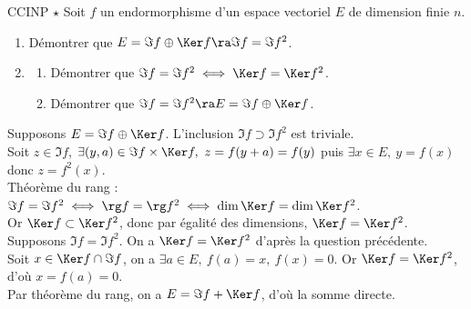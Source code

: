 \documentclass[11pt]{article}
\begin{document}

\begin{exercice}{CCINP $\star$}{}
    Soit $f$ un endormorphisme d'un espace vectoriel $E$ de dimension finie $n$.
    \begin{enumerate}
        \item Démontrer que $E=\Im f \oplus \Ker f \ra \Im f = \Im f^2$.
        \item \begin{enumerate}
            \item Démontrer que $\Im f = \Im f^2 \iff \Ker f = \Ker f^2$.
            \item Démontrer que $\Im f = \Im f^2 \ra E = \Im f \oplus \Ker f$.
        \end{enumerate}
    \end{enumerate}
    \tcblower
     Supposons $E=\Im f \oplus \Ker f$. L'inclusion $\Im f \supset \Im f^2$ est triviale.\\
    \boxed{\subset} Soit $z\in \Im f$, $\exists (y,a) \in \Im f\times \Ker f, ~ z=f(y+a)=f(y)$ puis $\exists x \in E, ~ y=f(x)$ donc $z=f^2(x)$.\\
     Théorème du rang : $\Im f = \Im f^2 \iff \rg f = \rg f^2 \iff \dim \Ker f = \dim \Ker f^2$.\\
    Or $\Ker f \subset \Ker f^2$, donc par égalité des dimensions, $\Ker f = \Ker f^2$.\\
     Supposons $\Im f = \Im f^2$. On a $\Ker f = \Ker f^2$ d'après la question précédente.\\
    Soit $x\in \Ker f \cap \Im f$, on a $\exists a \in E, ~ f(a)=x, ~ f(x)=0$. Or $\Ker f = \Ker f^2$, d'où $x=f(a)=0$.\\
    Par théorème du rang, on a $E=\Im f + \Ker f$, d'où la somme directe.
\end{exercice}

\pagebreak

\end{document}
